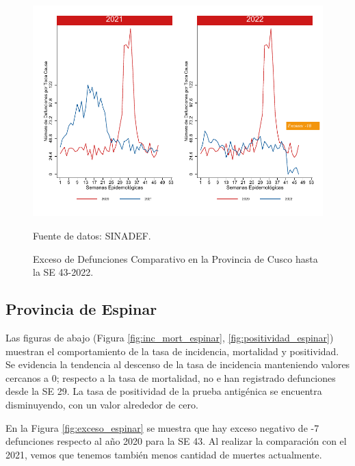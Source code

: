 \documentclass[12pt,a4paper,openany]{book}
\begin{document}
	\begin{figure}[h]
		\caption{Exceso de Defunciones Comparativo en la Provincia de Cusco hasta la SE 43-2022.}\label{fig:exceso_cusco}
		\begin{center}
			\includegraphics[width=0.7\linewidth]{../figuras/exceso_7.pdf}
		\end{center}
		{\footnotesize {Fuente de datos: SINADEF.}}
	\end{figure}
	
	\clearpage
	
	\subsection*{Provincia de Espinar}
	\noindent Las figuras de abajo (Figura \ref{fig:inc_mort_espinar}, \ref{fig:positividad_espinar}) muestran el comportamiento de la tasa de incidencia, mortalidad y positividad. Se evidencia la tendencia al descenso de la tasa de incidencia manteniendo valores cercanos a 0; respecto a la tasa de mortalidad, no e han registrado defunciones desde la SE 29. La tasa de positividad de la prueba antigénica se encuentra disminuyendo, con un valor alrededor de cero.
	
	En la Figura \ref{fig:exceso_espinar} se muestra que hay exceso negativo de -7 defunciones respecto al año 2020 para la SE 43. Al realizar la comparación con el 2021, vemos que tenemos también menos cantidad de muertes actualmente.
	
\end{document}
